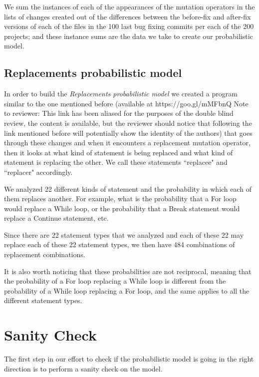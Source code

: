 \documentclass[conference]{IEEEtran}
\begin{document}
We sum the instances of each of the appearances of the mutation operators in the 
lists of changes created out of the differences between the before-fix and 
after-fix versions of each of the files in the 100 last bug fixing commits per 
each of the 200 projects; and these instance sums are the data we take to create 
our probabilistic model.
  


\subsection{Replacements probabilistic model}
In order to build the \textit{Replacements probabilistic model} we created a 
program similar to the one mentioned before (available at https://goo.gl/mMFbnQ
Note to reviewer: This link has been aliased for the purposes of the double 
blind review, the content is available, but the reviewer should notice that 
following the link mentioned before will potentially show the identity of the authors) that 
goes through these 
changes and when it encounters a  replacement mutation operator, then it looks 
at what kind of statement is being 
replaced and what kind of statement is replacing the other. We call these 
statements ``replacee" and ``replacer" accordingly.


We analyzed 22 different kinds of statement and the probability in which each of 
them replaces another. For example, what is the probability that a For loop 
would replace a While loop, or the probability that a Break statement would 
replace a Continue statement, etc.

Since there are 22 statement types that we analyzed and each of these 22 may 
replace each of these 22 statement types, we then have 484 combinations of 
replacement combinations. 

It is also worth noticing that these probabilities are not reciprocal, meaning 
that the probability of a For loop replacing a While loop is different from the 
probability of a While loop replacing a For loop, and the same applies to all 
the different statement types.


\section{Sanity Check}
The first step in our effort to check if the probabilistic model is going in the 
right direction is to perform a sanity check on the model.
\end{document}
